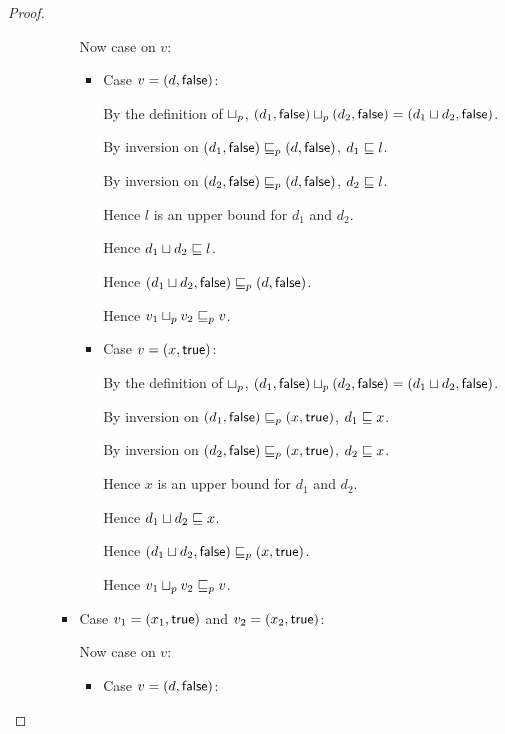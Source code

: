 \begin{proof}
\begin{enumerate}
\begin{enumerate}
\begin{itemize}
        Now case on $v$: 
        \begin{itemize}
        \item Case $v = (d, \textsf{false})$: 

          By the definition of $ \sqcup_p $,
          $(d_1, \textsf{false}) \sqcup_p (d_2, \textsf{false})
          = (d_1 \sqcup d_2, \textsf{false})$.

          By inversion on $(d_1, \textsf{false}) \sqsubseteq_p
          (d, \textsf{false})$, $d_1 \sqsubseteq l$.

          By inversion on $(d_2, \textsf{false}) \sqsubseteq_p
          (d, \textsf{false})$, $d_2 \sqsubseteq l$.

          Hence $l$ is an upper bound for $d_1$ and $d_2$.

          Hence $d_1 \sqcup d_2 \sqsubseteq l$.

          Hence $(d_1 \sqcup d_2, \textsf{false}) \sqsubseteq_p
          (d, \textsf{false})$.

          Hence $v_1 \sqcup_p v_2 \sqsubseteq_p v$.
          
        \item Case $v = (x, \textsf{true})$: 
          
          By the definition of $ \sqcup_p $, $(d_1, \textsf{false})
           \sqcup_p  (d_2, \textsf{false}) =
          (d_1 \sqcup d_2, \textsf{false})$.

          By inversion on $(d_1, \textsf{false}) \sqsubseteq_p
          (x, \textsf{true})$, $d_1 \sqsubseteq x$.

          By inversion on $(d_2, \textsf{false}) \sqsubseteq_p
          (x, \textsf{true})$, $d_2 \sqsubseteq x$.
     
          Hence $x$ is an upper bound for $d_1$ and $d_2$.

          Hence $d_1 \sqcup d_2 \sqsubseteq x$.

          Hence $(d_1 \sqcup d_2, \textsf{false}) \sqsubseteq_p
          (x, \textsf{true})$.

          Hence $v_1 \sqcup_p v_2 \sqsubseteq_p v$.
        \end{itemize}
        
      \item Case $v_1 = (x_1, \textsf{true})$ and $v_2 =
        (x_2, \textsf{true})$:
        
        Now case on $v$: 
        \begin{itemize}
        \item Case $v = (d, \textsf{false})$: 
          

\end{itemize}
\end{itemize}
\end{enumerate}
\end{enumerate}
\end{proof}
